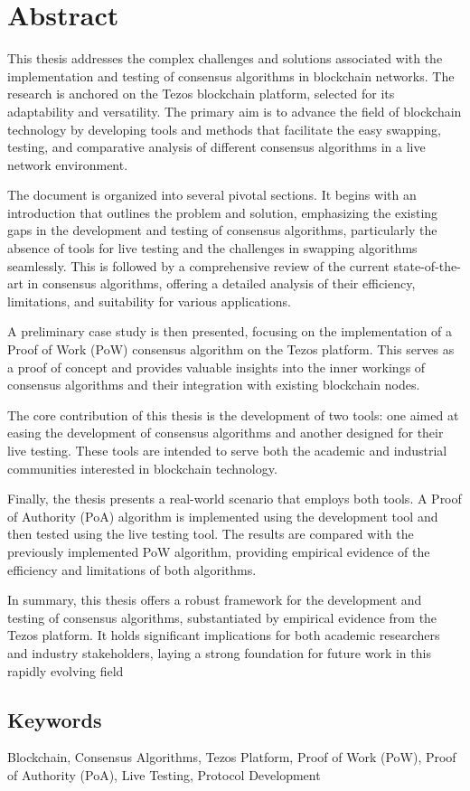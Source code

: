 \chapter*{Abstract}
This thesis addresses the complex challenges and solutions associated with the implementation and testing of consensus algorithms in blockchain networks. The research is anchored on the Tezos blockchain platform, selected for its adaptability and versatility. The primary aim is to advance the field of blockchain technology by developing tools and methods that facilitate the easy swapping, testing, and comparative analysis of different consensus algorithms in a live network environment.

The document is organized into several pivotal sections. It begins with an introduction that outlines the problem and solution, emphasizing the existing gaps in the development and testing of consensus algorithms, particularly the absence of tools for live testing and the challenges in swapping algorithms seamlessly. This is followed by a comprehensive review of the current state-of-the-art in consensus algorithms, offering a detailed analysis of their efficiency, limitations, and suitability for various applications.

A preliminary case study is then presented, focusing on the implementation of a Proof of Work (PoW) consensus algorithm on the Tezos platform. This serves as a proof of concept and provides valuable insights into the inner workings of consensus algorithms and their integration with existing blockchain nodes.

The core contribution of this thesis is the development of two tools: one aimed at easing the development of consensus algorithms and another designed for their live testing. These tools are intended to serve both the academic and industrial communities interested in blockchain technology.

Finally, the thesis presents a real-world scenario that employs both tools. A Proof of Authority (PoA) algorithm is implemented using the development tool and then tested using the live testing tool. The results are compared with the previously implemented PoW algorithm, providing empirical evidence of the efficiency and limitations of both algorithms.

In summary, this thesis offers a robust framework for the development and testing of consensus algorithms, substantiated by empirical evidence from the Tezos platform. It holds significant implications for both academic researchers and industry stakeholders, laying a strong foundation for future work in this rapidly evolving field


\section*{Keywords}
Blockchain, Consensus Algorithms, Tezos Platform, Proof of Work (PoW), Proof of Authority (PoA), Live Testing, Protocol Development
